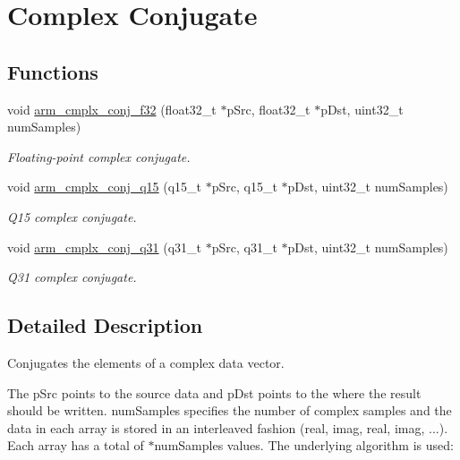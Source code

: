 \hypertarget{group__cmplx__conj}{}\section{Complex Conjugate}
\label{group__cmplx__conj}
\subsection*{Functions}
\begin{DoxyCompactItemize}
\item 
void \hyperlink{group__cmplx__conj_ga3a102aead6460ad9fcb0626f6b226ffb}{arm\+\_\+cmplx\+\_\+conj\+\_\+f32} (float32\+\_\+t $\ast$p\+Src, float32\+\_\+t $\ast$p\+Dst, uint32\+\_\+t num\+Samples)
\begin{DoxyCompactList}\small\item\em Floating-\/point complex conjugate. \end{DoxyCompactList}\item 
void \hyperlink{group__cmplx__conj_gaf47689ae07962acaecb8ddde556df4a4}{arm\+\_\+cmplx\+\_\+conj\+\_\+q15} (q15\+\_\+t $\ast$p\+Src, q15\+\_\+t $\ast$p\+Dst, uint32\+\_\+t num\+Samples)
\begin{DoxyCompactList}\small\item\em Q15 complex conjugate. \end{DoxyCompactList}\item 
void \hyperlink{group__cmplx__conj_gafecc94879a383c5208ec3ef99485e4b5}{arm\+\_\+cmplx\+\_\+conj\+\_\+q31} (q31\+\_\+t $\ast$p\+Src, q31\+\_\+t $\ast$p\+Dst, uint32\+\_\+t num\+Samples)
\begin{DoxyCompactList}\small\item\em Q31 complex conjugate. \end{DoxyCompactList}\end{DoxyCompactItemize}


\subsection{Detailed Description}
Conjugates the elements of a complex data vector.

The {\ttfamily p\+Src} points to the source data and {\ttfamily p\+Dst} points to the where the result should be written. {\ttfamily num\+Samples} specifies the number of complex samples and the data in each array is stored in an interleaved fashion (real, imag, real, imag, ...). Each array has a total of {$\ast$num\+Samples} values. The underlying algorithm is used\+:


